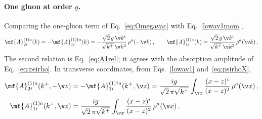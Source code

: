 \paragraph{One gluon at order $g$.}
Comparing the one-gluon term of Eq.~\eqref{eq:Omegavac} with Eq.~\eqref{lowav1mom},
\begin{align}\label{A1coeffM}
\mf{A}^{(1)a}_{2i}(k)=-\mf{A}^{(1)\dagger a}_{1i}(k)=-\frac{\sqrt{2}\,g\,\v k^{i}}{\sqrt{k^{+}}\,\v k^{2}}\,\rho^{a}(-\v k)\,,\qquad
\mf{A}^{(1)a}_{1i}(k)=\frac{\sqrt{2}\,g\,\v k^{i}}{\sqrt{k^{+}}\,\v k^{2}}\,\rho^{a}(\v k)\,.
\end{align}
The second relation is Eq.~\eqref{eq:A1rel}; it agrees with the absorption amplitude of
Eq.~\eqref{eq:psirho}. In transverse coordinates, from Eqs.~\eqref{lowav1} and~\eqref{eq:psirhoX},
\begin{align}\label{A1coeff}
\mf{A}^{(1)a}_{2i}(k^{+},-\v z)&=-\mf{A}^{(1)\dagger a}_{1i}(k^{+},\v z)
=\frac{ig}{\sqrt{2}\,\pi\sqrt{k^{+}}}\int_{\v x}\frac{(x-z)^{i}}{(x-z)^{2}}\,\rho^{a}(\v x)\,,\notag\\
\mf{A}^{(1)a}_{1i}(k^{+},\v z)&=\frac{ig}{\sqrt{2}\,\pi\sqrt{k^{+}}}\int_{\v x}\frac{(x-z)^{i}}{(x-z)^{2}}\,\rho^{a}(\v x)\,.
\end{align}

